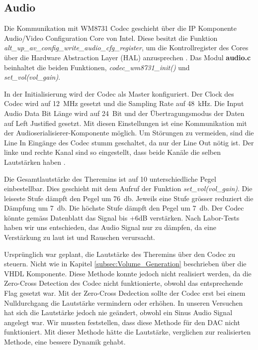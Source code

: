 \subsection{Audio}\label{subsec:audio}

Die Kommunikation mit WM8731 Codec geschieht über die IP Komponente Audio/Video Configuration Core von Intel. Diese besitzt die Funktion 
\textit{alt\_up\_av\_config\_write\_audio\_cfg\_register}, um die Kontrollregister des Cores über die Hardware Abstraction Layer (HAL) anzusprechen \cite{Audio_config}.
Das Modul \textbf{audio.c} beinhaltet die beiden Funktionen, \textit{codec\_wm8731\_init()} und\\ \textit{set\_vol(vol\_gain)}. 

In der Initialisierung wird der Codec als Master konfiguriert. Der Clock des Codec wird auf \SI{12}{MHz} gesetzt und die Sampling Rate auf \SI{48}{kHz}. Die Input Audio Data Bit Länge wird auf \SI{24}{Bit} und der Übertragungsmodus der Daten auf Left Justified gesetzt. Mit diesen Einstellungen ist eine Kommunikation mit der Audioserialisierer-Komponente möglich.
Um Störungen zu vermeiden, sind die Line In Eingänge des Codec stumm geschaltet, da nur der Line Out nötig ist. Der linke und rechte Kanal sind so eingestellt, dass beide Kanäle die selben Lautstärken haben \cite{codec}. 

Die Gesamtlautstärke des Theremins ist auf 10 unterschiedliche Pegel einbestellbar. Dies geschieht mit dem Aufruf der Funktion \textit{set\_vol(vol\_gain)}. Die leiseste Stufe dämpft den Pegel um \SI{76}{db}. Jeweils eine Stufe grösser reduziert die Dämpfung um \SI{7}{db}. Die höchste Stufe dämpft den Pegel um \SI{7}{db}. Der Codec könnte gemäss Datenblatt das Signal bis +6dB verstärken. Nach Labor-Tests haben wir uns entschieden, das Audio Signal nur zu dämpfen, da eine Verstärkung zu laut ist und Rauschen verursacht.

Ursprünglich war geplant, die Lautstärke des Theremins über den Codec zu steuern. Nicht wie in Kapitel \ref{subsec:Volume_Generation} beschrieben über die VHDL Komponente. Diese Methode konnte jedoch nicht realisiert werden, da die Zero-Cross Detection des Codec nicht funktionierte, obwohl das entsprechende Flag gesetzt war. Mit der Zero-Cross Dedection sollte der Codec erst bei einem Nulldurchgang die Lautstärke vermindern oder erhöhen. In unseren Versuchen hat sich die Lautstärke jedoch nie geändert, obwohl ein Sinus Audio Signal angelegt war. Wir mussten feststellen, dass diese Methode für den DAC nicht funktioniert. Mit dieser Methode hätte die Lautstärke, verglichen zur realisierten Methode, eine bessere Dynamik gehabt. 